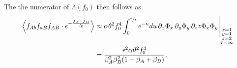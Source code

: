 \documentclass[11pt]{article}
\begin{document}
The the numerator of $\Lambda(f_0)$ then follows as
\begin{align}\label{eq:lambda_num_large_rho}
    \left\langle f_{Ab}f_{aB}f_{AB}\cdot e^{-\frac{f_{A}+f_{B}}{f_0}}\right\rangle 
    &\approx \alpha \theta^2 f_0^4 \int_0^{\nicefrac{\tau}{\epsilon}} e^{-u} du \, \partial_x \Phi_x \, \partial_y \Phi_y \, \partial_z z \Phi_x\Phi_y\Bigg\vert_{\substack{x=1 \\ y=1 \\ z=2 \\ \tau=\infty}} \\ \nonumber
    &= \frac{\epsilon^2\alpha\theta^2f_0^4}{\beta_A^2\beta_B^2(1+\beta_A+\beta_B)},
\end{align}
\end{document}
